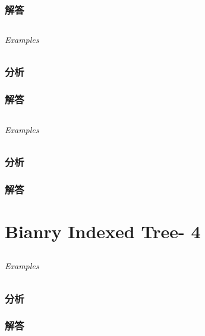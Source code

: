 \documentclass[UTF8,a4paper,12pt]{ctexbook}
\begin{document}
	\subsection{解答}
	
\section{}
	
	\subparagraph{Examples}
	
	\subsection{分析}
	
	\subsection{解答}
	
\section{}
	
	\subparagraph{Examples}
	
	\subsection{分析}
	
	\subsection{解答}
	
\chapter{Bianry Indexed Tree- 4}
\section{}
	
	\subparagraph{Examples}
	
	\subsection{分析}
	
	\subsection{解答}
	
\section{}
	
\end{document}
